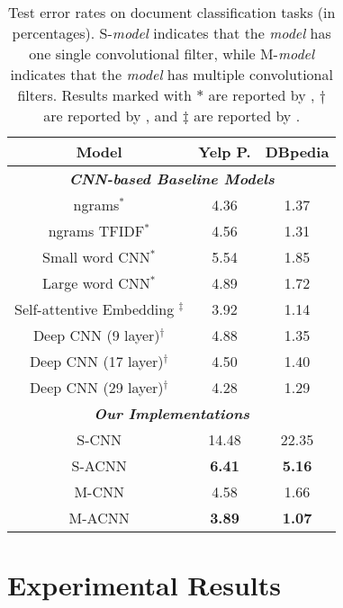 \documentclass[11pt,a4paper]{article}
\begin{document}
\begin{table}[t!]
	\centering
\begin{tabular}{c|c|c}
		\toprule[1.2pt]
		\textbf{Model} &  	\textbf{Yelp P.} &  	\textbf{DBpedia}  \\
		\hline
		\multicolumn{3}{c}{\emph{\textbf{CNN-based Baseline Models}}} \\
		\hline
		ngrams$^{\ast}$     & 4.36 &  1.37     \\
		ngrams TFIDF$^{\ast}$     & 4.56 &  1.31     \\
		Small word CNN$^{\ast}$        & 5.54 & 1.85  \\ 
		Large word CNN$^{\ast}$        & 4.89 & 1.72  \\ 
Self-attentive Embedding $^{\ddagger}$    & 3.92 & 1.14  \\ 
Deep CNN (9 layer)$^{\dagger}$         &  4.88 & 1.35  \\
		Deep CNN (17 layer)$^{\dagger}$           &  4.50 &  1.40 \\
		Deep CNN (29 layer)$^{\dagger}$       & 4.28 &  1.29 \\
		\hline
		\multicolumn{3}{c}{\emph{\textbf{Our Implementations}}} \\
		\hline
		S-CNN         & 14.48 & 22.35 \\
		S-ACNN         & \textbf{6.41} & \textbf{5.16}  \\
		\hline
		M-CNN         & 4.58 & 1.66 \\
		M-ACNN         & \textbf{3.89} & \textbf{1.07}  \\
		\bottomrule[1.2pt]
	\end{tabular}
\caption{\small Test error rates on document classification tasks (in percentages). S-\emph{model} indicates that the \emph{model} has one single convolutional filter, while M-\emph{model} indicates that the \emph{model} has multiple convolutional filters. Results marked with $\ast$ are reported by \cite{zhang2015character}, $\dagger$ are reported by \cite{conneau2016very}, and $\ddagger$ are reported by \cite{lin2017structured}.}
	\label{tab:topic}
\vspace{-4mm}
\end{table}

\section{Experimental Results}
\end{document}
